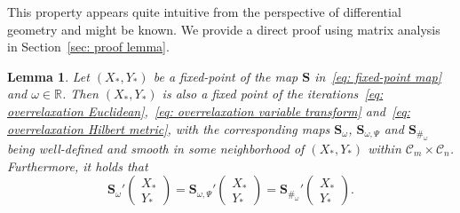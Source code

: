 \documentclass[a4paper]{article}
\newcommand{\bS}{\mathbf{S}}
\newcommand{\caC}{\mathcal{C}}
\newtheorem{lemma}[theorem]{Lemma}
\theoremstyle{definition}
\numberwithin{equation}{section}
\begin{document}
This property appears quite intuitive from the perspective of differential geometry and might be known. We provide a direct proof using matrix analysis in Section~\ref{sec: proof lemma}.

\begin{lemma}\label{lem: equal derivatives}
Let $(X_*,Y_*)$ be a fixed-point of the map $\bS$ in~\eqref{eq: fixed-point map} and $\omega \in \mathbb R$. Then $(X_*,Y_*)$ is also a fixed point of the iterations~\eqref{eq: overrelaxation Euclidean},~\eqref{eq: overrelaxation variable transform} and~\eqref{eq: overrelaxation Hilbert metric}, with the corresponding maps $\bS_\omega$, $\bS_{\omega,\Psi}$ and $\bS_{\#_\omega}$ being well-defined and smooth in some neighborhood of $(X_*,Y_*)$ within $\caC_m \times \caC_n$. Furthermore, it holds that
\[
 \bS_\omega'\!\begin{pmatrix} X_* \\ Y_* \end{pmatrix} = \bS_{\omega,\Psi}'\!\begin{pmatrix} X_* \\ Y_* \end{pmatrix} = \bS_{\#_\omega}'\!\begin{pmatrix} X_* \\ Y_* \end{pmatrix}. 
\]
\end{lemma}
\end{document}
